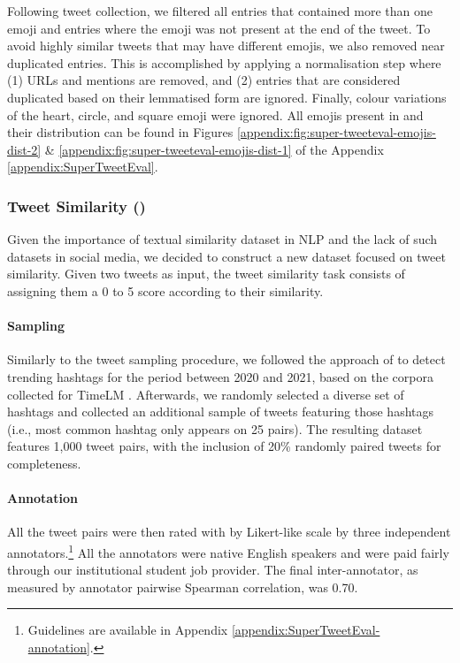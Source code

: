Following tweet collection, we filtered all entries that contained more than one emoji and entries where the emoji was not present at the end of the tweet. To avoid highly similar tweets that may have different emojis, we also removed near duplicated entries. This is accomplished by applying a normalisation step where (1) URLs and mentions are removed, and (2) entries that are considered duplicated based on their lemmatised form are ignored. Finally, colour variations of the heart, circle, and square emoji were ignored. All emojis present in {\TweetEmoji} and their distribution can be found in Figures \ref{appendix:fig:super-tweeteval-emojis-dist-2} \& \ref{appendix:fig:super-tweeteval-emojis-dist-1} of the Appendix \ref{appendix:SuperTweetEval}.

\subsubsection{Tweet Similarity ({\TweetSimilarity})}
\label{sec:tweet_similarity}
Given the importance of textual similarity dataset in NLP \cite{cer-etal-2017-semeval} and the lack of such datasets in social media, we decided to construct a new dataset focused on tweet similarity. Given two tweets as input, the tweet similarity task consists of assigning them a 0 to 5 score according to their similarity.

\paragraph{Sampling} Similarly to the {\TempoWiC} tweet sampling procedure, we followed the approach of  to detect trending hashtags for the period between 2020 and 2021, based on the corpora collected for TimeLM \cite{loureiro-etal-2022-timelms}. Afterwards, we randomly selected a diverse set of hashtags and collected an additional sample of tweets featuring those hashtags (i.e., most common hashtag only appears on 25 pairs). The resulting dataset features 1,000 tweet pairs, with the inclusion of 20\% randomly paired tweets for completeness.

\paragraph{Annotation} All the tweet pairs were then rated with by Likert-like scale by three independent annotators.\footnote{Guidelines are available in Appendix \ref{appendix:SuperTweetEval-annotation}.} All the annotators were native English speakers and were paid fairly through our institutional student job provider. The final inter-annotator, as measured by annotator pairwise Spearman correlation, was 0.70.



